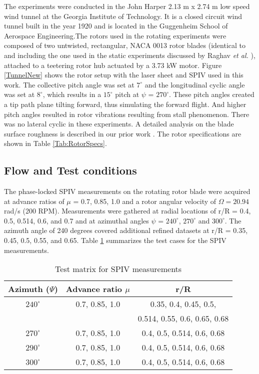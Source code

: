 \documentclass[%
 reprint,
 showkeys,
 amsmath,amssymb,
 aps,
]{revtex4-1}
\begin{document}
The experiments were conducted in the John Harper 2.13 m x 2.74 m low speed wind tunnel at the Georgia Institute of Technology. It is a closed circuit wind tunnel built in the year 1920 and is located in the Guggenheim School of Aerospace Engineering.The rotors used in the rotating experiments were composed of two untwisted, rectangular, NACA 0013 rotor blades (identical to and including the one used in the static experiments discussed by Raghav \textit{et al.} \cite{4RaghavPhD2014}), attached to a teetering rotor hub actuated by a 3.73 kW motor. Figure \ref{TunnelNew} shows the rotor setup with the laser sheet and SPIV used in this work. The collective pitch angle was set at $7^{\circ}$ and the longitudinal cyclic angle was set at $8^{\circ}$, which results in a $15^\circ$ pitch at $\psi$ = $270^\circ$. These pitch angles created a tip path plane tilting forward, thus simulating the forward flight. And higher pitch angles resulted in rotor vibrations resulting from stall phenomenon. There was no lateral cyclic in these experiments. A detailed analysis on the blade surface roughness is described in our prior work \cite{4RaghavPhD2014}. The rotor specifications are shown in Table \ref{Tab:RotorSpecs}. 

\subsection{Flow and Test conditions}
The phase-locked SPIV measurements on the rotating rotor blade were acquired at advance ratios of $\mu$ = 0.7, 0.85, 1.0 and a rotor angular velocity of $\Omega = 20.94$ rad/s (200 RPM). Measurements were gathered at radial locations of r/R = 0.4, 0.5, 0.514, 0.6, and 0.7 and at azimuthal angles $\psi$ = $240^{\circ}$, $270^{\circ}$ and $300^{\circ}$. The azimuth angle of 240 degrees covered additional refined datasets at r/R = 0.35, 0.45, 0.5, 0.55, and 0.65. Table \ref{Tab:TestMatrixSPIV} summarizes the test cases for the SPIV measurements.  

\begin{table}[!t]
	\centering
	\caption{Test matrix for SPIV measurements}
	\begin{tabular}{ |c||c|c| }
		\hline
		Azimuth ($\Psi$)  & Advance ratio $\mu$  & r/R \\
		\hline
		$240^{\circ}$& 0.7, 0.85, 1.0 & 0.35, 0.4, 0.45, 0.5,  \\
		             &                & 0.514, 0.55, 0.6, 0.65, 0.68\\
		$270^{\circ}$& 0.7, 0.85, 1.0 & 0.4, 0.5, 0.514, 0.6, 0.68 \\
		$290^{\circ}$& 0.7, 0.85, 1.0 & 0.4, 0.5, 0.514, 0.6, 0.68 \\
		$300^{\circ}$& 0.7, 0.85, 1.0 & 0.4, 0.5, 0.514, 0.6, 0.68 \\
		\hline
	\end{tabular}
	
	\label{Tab:TestMatrixSPIV}
\end{table}
\end{document}
